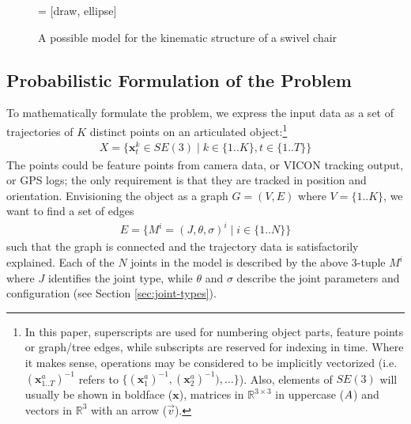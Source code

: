 \documentclass[letterpaper, 10 pt, conference]{ieeeconf}  %
\def\xmat{\uppercase}    \def\xmatstr{in uppercase}
\def\xvec{\vec}          \def\xvecstr{with an arrow}
\def\xse{\bm}            \def\xsestr{in boldface}
\begin{document}
        \begin{figure}[ht]
          \centering
           = [draw, ellipse]
          \caption{A possible model for the kinematic structure of a swivel chair}
          \label{fig:Sswivel}
        \end{figure}

\subsection{Probabilistic Formulation of the Problem}
To mathematically formulate the problem, we express the input data as a set of trajectories of $K$ distinct points on an articulated object:\footnote{In this paper, superscripts are used for numbering object parts, feature points or graph/tree edges, while subscripts are reserved for indexing in time. Where it makes sense, operations may be considered to be implicitly vectorized (i.e. $(\xse{x}_{1..T}^a)^{-1}$ refers to $\{(\xse{x}_1^a)^{-1}, (\xse{x}_2^a)^{-1}), \dots\}$). Also, elements of $SE(3)$ will usually be shown \xsestr{} ($\xse{x}$), matrices in $\mathbb{R}^{3 \times 3}$ \xmatstr{} ($\xmat{a}$) and vectors in $\mathbb{R}^3$ \xvecstr{} ($\xvec{v}$).}
\begin{align}
  X = \{ \xse{x}_t^k \in SE(3) \mid k \in \{1..K\}, t \in \{1..T\} \}
\end{align}
The points could be feature points from camera data, or VICON tracking output, or GPS logs; the only requirement is that they are tracked in position and orientation. Envisioning the object as a graph $G = (V,E)$ where $V = \{1..K\}$, we want to find a set of edges
\begin{align}
  E = \{M^i = (J,\theta,\sigma)^i \mid i \in \{1..N\}\} \label{eqn:m-tuple}
\end{align}
such that the graph is connected and the trajectory data is satisfactorily explained. Each of the $N$ joints in the model is described by the above 3-tuple $M^i$ where $J$ identifies the joint type, while $\theta$ and $\sigma$ describe the joint parameters and configuration (see Section \ref{sec:joint-types}).
\end{document}
